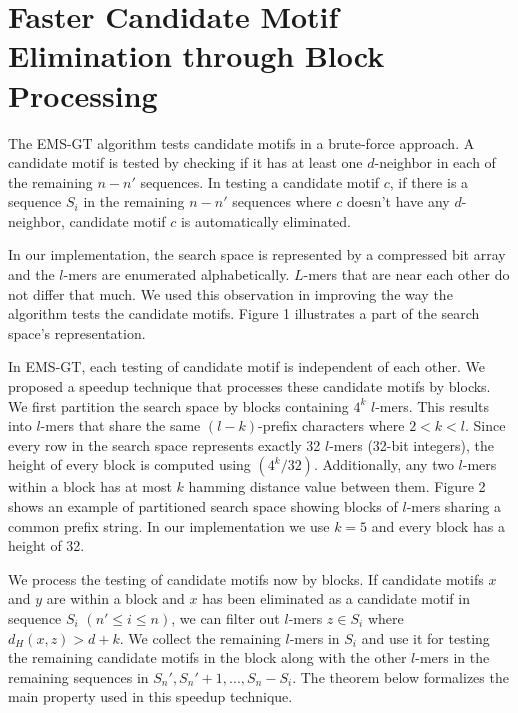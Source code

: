 
\section{Faster Candidate Motif Elimination through Block Processing}

The EMS-GT algorithm tests candidate motifs in a brute-force approach. A candidate motif is tested by checking if it has at least one $d$-neighbor in each of the remaining $n - n'$ sequences. In testing a candidate motif $c$, if there is a sequence $S_i$ in the remaining $n - n'$ sequences where $c$ doesn't have any $d$-neighbor, candidate motif $c$ is automatically eliminated.

In our implementation, the search space is represented by a compressed bit array and the $l$-mers are enumerated alphabetically. $L$-mers that are near each other do not differ that much. We used this observation in improving the way the algorithm tests the candidate motifs. Figure 1 illustrates a part of the search space's representation.



In EMS-GT, each testing of candidate motif is independent of each other. We proposed a speedup technique that processes these candidate motifs by blocks. We first partition the search space by blocks containing $4^k$ $l$-mers. This results into $l$-mers that share the same $(l-k)$-prefix characters where $2 < k < l$. Since every row in the search space represents exactly 32 $l$-mers (32-bit integers), the height of every block is computed using $(4^k / 32)$. Additionally, any two $l$-mers within a block has at most $k$ hamming distance value between them. Figure 2 shows an example of partitioned search space showing blocks of $l$-mers sharing a common prefix string. In our implementation we use $k = 5$ and every block has a height of 32.



We process the testing of candidate motifs now by blocks. If candidate motifs $x$ and $y$ are within a block and $x$ has been eliminated as a candidate motif in sequence $S_i$ $(n' \leq i \leq n)$, we can filter out $l$-mers $z \in S_i$ where $d_H(x,z) > d + k$. We collect the remaining $l$-mers in $S_i$ and use it for testing the remaining candidate motifs in the block along with the other $l$-mers in the remaining sequences in ${S_n', S_n'+1, ..., S_n} - {S_i}$. The theorem below formalizes the main property used in this speedup technique.

